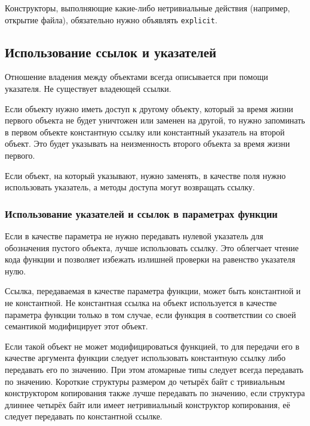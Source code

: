 Конструкторы, выполняющие какие-либо нетривиальные действия (например, открытие файла), обязательно нужно объявлять \lstinline|explicit|.

\newpage
\subsection{Использование ссылок и указателей}

Отношение владения между объектами всегда описывается при помощи указателя. Не существует владеющей ссылки.

Если объекту нужно иметь доступ к другому объекту, который за время жизни первого объекта не будет уничтожен или заменен на другой, то нужно запоминать в первом объекте константную ссылку или константный указатель на второй объект. Это будет указывать на неизменность второго объекта за время жизни первого.

Если объект, на который указывают, нужно заменять, в качестве поля нужно использовать указатель, а методы доступа могут возвращать ссылку.

\subsubsection{Использование указателей и ссылок в параметрах функции}

Если в качестве параметра не нужно передавать нулевой указатель для обозначения пустого объекта, лучше использовать ссылку. Это облегчает чтение кода функции и позволяет избежать излишней проверки на равенство указателя нулю.

Ссылка, передаваемая в качестве параметра функции, может быть константной и не константной. Не константная ссылка на объект используется в качестве параметра функции только в том случае, если функция в соответствии со своей семантикой модифицирует этот объект.

Если такой объект не может модифицироваться функцией, то для передачи его в качестве аргумента функции следует использовать константную ссылку либо передавать его по значению. При этом атомарные типы следует всегда передавать по значению. Короткие структуры размером до четырёх байт с тривиальным конструктором копирования также лучше передавать по значению, если структура длиннее четырёх байт или имеет нетривиальный конструктор копирования, её следует передавать по константной ссылке.

